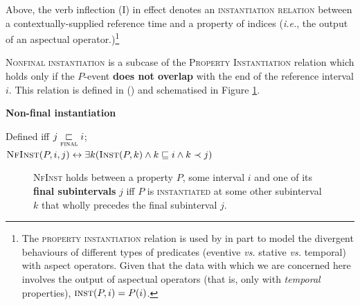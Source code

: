 Above, the verb inflection (\gls{I}) in effect denotes an \textsc{instantiation relation} between a contextually-supplied reference time and a property of indices (\textit{i.e.}, the output of an aspectual operator.)\footnote{
	The \textsc{property instantiation} relation is used by \citet{Deo2006,Condoravdi2014} in part to model the divergent behaviours of different types of predicates (eventive \textit{vs.} stative \textit{vs.} temporal) with aspect operators. Given that the data with which we are concerned here involves the output of aspectual operators (that is, only with \textit{temporal} properties), $\textsc{inst}(P,i)=P(i) $.}

\textsc{Nonfinal instantiation} is a subcase of the \textsc{Property Instantiation} relation which holds only if the $ P $-event \textbf{does not overlap} with the end of the reference interval $ i $. This relation is defined in () and schematised in Figure \ref{nfi.dia}.

\pex\textbf{Non-final instantiation}

Defined iff $ j\underset{\textsc{final}}{\sqsubset}i $;\\ $\textsc{NfInst}(P,i,j)\leftrightarrow\exists k(\textsc{Inst}(P,k)\wedge k\sqsubseteq i\wedge k\prec j) $\xe


\begin{figure}[h!]\centering
	\caption[Non-final Instantiation \citep{Condoravdi2014}]{\textsc{NfInst} holds between a property $ P $, some interval $ i $ and one of its \textbf{final subintervals} $ j $ iff $ P $ is \textsc{instantiated} at some other subinterval $ k $ that wholly precedes the final subinterval $ j $.}\label{nfi.dia}

\end{figure}

